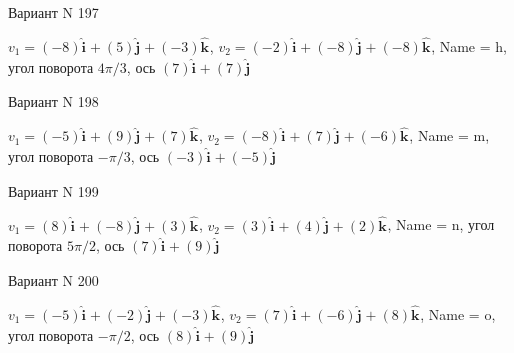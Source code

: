 \documentclass[11pt]{report}
\begin{document}
Вариант N 197

$v_1 = \left(-8\right)\mathbf{\hat{i}_{}} + \left(5\right)\mathbf{\hat{j}_{}} + \left(-3\right)\mathbf{\hat{k}_{}}$, $v_2 = \left(-2\right)\mathbf{\hat{i}_{}} + \left(-8\right)\mathbf{\hat{j}_{}} + \left(-8\right)\mathbf{\hat{k}_{}}$, Name = h, угол поворота $4 \pi / 3$, ось $\left(7\right)\mathbf{\hat{i}_{}} + \left(7\right)\mathbf{\hat{j}_{}}$

Вариант N 198

$v_1 = \left(-5\right)\mathbf{\hat{i}_{}} + \left(9\right)\mathbf{\hat{j}_{}} + \left(7\right)\mathbf{\hat{k}_{}}$, $v_2 = \left(-8\right)\mathbf{\hat{i}_{}} + \left(7\right)\mathbf{\hat{j}_{}} + \left(-6\right)\mathbf{\hat{k}_{}}$, Name = m, угол поворота $- \pi / 3$, ось $\left(-3\right)\mathbf{\hat{i}_{}} + \left(-5\right)\mathbf{\hat{j}_{}}$

Вариант N 199

$v_1 = \left(8\right)\mathbf{\hat{i}_{}} + \left(-8\right)\mathbf{\hat{j}_{}} + \left(3\right)\mathbf{\hat{k}_{}}$, $v_2 = \left(3\right)\mathbf{\hat{i}_{}} + \left(4\right)\mathbf{\hat{j}_{}} + \left(2\right)\mathbf{\hat{k}_{}}$, Name = n, угол поворота $5 \pi / 2$, ось $\left(7\right)\mathbf{\hat{i}_{}} + \left(9\right)\mathbf{\hat{j}_{}}$

Вариант N 200

$v_1 = \left(-5\right)\mathbf{\hat{i}_{}} + \left(-2\right)\mathbf{\hat{j}_{}} + \left(-3\right)\mathbf{\hat{k}_{}}$, $v_2 = \left(7\right)\mathbf{\hat{i}_{}} + \left(-6\right)\mathbf{\hat{j}_{}} + \left(8\right)\mathbf{\hat{k}_{}}$, Name = o, угол поворота $- \pi / 2$, ось $\left(8\right)\mathbf{\hat{i}_{}} + \left(9\right)\mathbf{\hat{j}_{}}$
\end{document}
